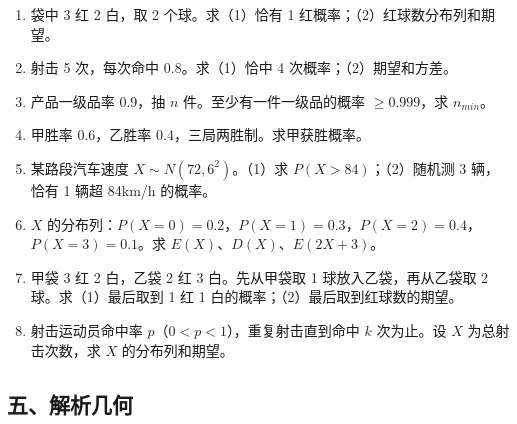 \begin{enumerate}
  \item[★] 袋中 3 红 2 白，取 2 个球。求（1）恰有 1 红概率；（2）红球数分布列和期望。
  \vspace{3cm}
  \item[★] 射击 5 次，每次命中 0.8。求（1）恰中 4 次概率；（2）期望和方差。
  \vspace{2.5cm}
  \item[★★] 产品一级品率 0.9，抽 $n$ 件。至少有一件一级品的概率 $\ge0.999$，求 $n_{min}$。
  \vspace{2cm}
  \item[★★] 甲胜率 0.6，乙胜率 0.4，三局两胜制。求甲获胜概率。
  \vspace{2.5cm}
  \item[★★] 某路段汽车速度 $X\sim N(72,6^2)$。（1）求 $P(X>84)$；（2）随机测 3 辆，恰有 1 辆超 84km/h 的概率。
  \vspace{3cm}
  \item[★★] $X$ 的分布列：$P(X=0)=0.2$，$P(X=1)=0.3$，$P(X=2)=0.4$，$P(X=3)=0.1$。求 $E(X)$、$D(X)$、$E(2X+3)$。
  \vspace{2.5cm}
  \item[★★★] 甲袋 3 红 2 白，乙袋 2 红 3 白。先从甲袋取 1 球放入乙袋，再从乙袋取 2 球。求（1）最后取到 1 红 1 白的概率；（2）最后取到红球数的期望。
  \vspace{4cm}
  \item[★★★] 射击运动员命中率 $p$（$0<p<1$），重复射击直到命中 $k$ 次为止。设 $X$ 为总射击次数，求 $X$ 的分布列和期望。
  \vspace{3cm}
\end{enumerate}

\subsection{五、解析几何}

